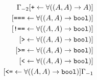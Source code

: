 \begin{eqnarray*}
 & &
      \Gamma_{-2}
                 [ \texttt{+} \leftarrow \forall((A, A) \rightarrow A)] \\
&& \hspace{6mm}  [ \texttt{===} \leftarrow \forall((A, A) \rightarrow \texttt{bool})] \\
&& \hspace{6mm}  [ \texttt{!==} \leftarrow \forall((A, A) \rightarrow \texttt{bool})] \\
&& \hspace{6mm}  [ \texttt{>} \leftarrow \forall((A, A) \rightarrow \texttt{bool})]\\
&& \hspace{6mm}  [ \texttt{>=} \leftarrow \forall((A, A) \rightarrow \texttt{bool})]\\
&& \hspace{6mm}  [ \texttt{<} \leftarrow \forall((A, A) \rightarrow \texttt{bool})] \\
&& \hspace{6mm}  [ \texttt{<=} \leftarrow \forall((A, A) \rightarrow \texttt{bool})]\Gamma_{-1}
\end{eqnarray*}

